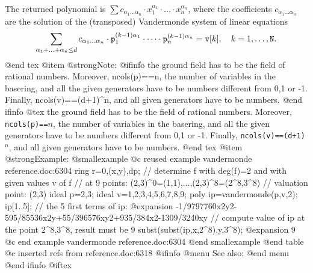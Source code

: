 {{{{{{{The returned polynomial is $\sum
c_{\alpha_1\ldots\alpha_n}\cdot x_1^{\alpha_1} \cdot \dots \cdot
x_n^{\alpha_n}$, where the coefficients
$c_{\alpha_1\ldots\alpha_n}$ are the solution of the (transposed)
Vandermonde system of linear equations
$$ \sum_{\alpha_1+\ldots+\alpha_n\leq d} c_{\alpha_1\ldots\alpha_n} \cdot
{\tt p}_1^{(k-1)\alpha_1}\cdot\dots\cdot {\tt p}_n^{(k-1)\alpha_n} =
{\tt v}[k], \quad  k=1,\dots,{\tt N}.$$
@end tex
@item @strong{Note:}
@ifinfo
the ground field has to be the field of rational
numbers. Moreover, ncols(p)==n, the number of variables in the
basering, and all the given generators have to be numbers different from
0,1 or -1. Finally, ncols(v)==(d+1)^n, and all given generators have
to be numbers.
@end ifinfo
@tex
the ground field has to be the field of rational
numbers. Moreover, {\tt ncols(p)==}$n$, the number of variables in the
basering, and all the given generators have to be numbers different from
0,1 or -1. Finally, {\tt ncols(v)==(d+1)$^n$}, and all given generators have
to be numbers.
@end tex
@item @strong{Example:}
@smallexample
@c reused example vandermonde reference.doc:6304 
ring r=0,(x,y),dp;
// determine f with deg(f)=2 and with given values v of f
// at 9 points: (2,3)^0=(1,1),...,(2,3)^8=(2^8,3^8)
// valuation point: (2,3)
ideal p=2,3;
ideal v=1,2,3,4,5,6,7,8,9;
poly ip=vandermonde(p,v,2);
ip[1..5];  //  the 5 first terms of ip:
@expansion{} -1/9797760x2y2-595/85536x2y+55/396576xy2+935/384x2-1309/3240xy
// compute value of ip at the point 2^8,3^8, result must be 9
subst(subst(ip,x,2^8),y,3^8);
@expansion{} 9
@c end example vandermonde reference.doc:6304
@end smallexample
@end table
@c inserted refs from reference.doc:6318
@ifinfo
@menu
See also:
@end menu
@end ifinfo
@iftex

}}}}}}}
